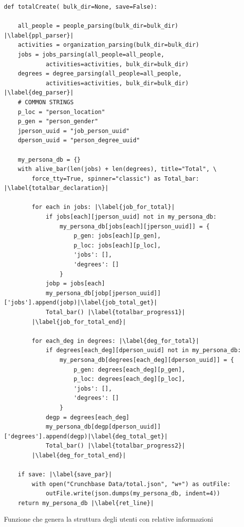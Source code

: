 \begin{listing}[htbp]
\begin{verbatim}
def totalCreate( bulk_dir=None, save=False):
    
    all_people = people_parsing(bulk_dir=bulk_dir)  |\label{ppl_parser}|
    activities = organization_parsing(bulk_dir=bulk_dir)
    jobs = jobs_parsing(all_people=all_people,
            activities=activities, bulk_dir=bulk_dir)
    degrees = degree_parsing(all_people=all_people, 
            activities=activities, bulk_dir=bulk_dir) |\label{deg_parser}|
    # COMMON STRINGS
    p_loc = "person_location"
    p_gen = "person_gender"
    jperson_uuid = "job_person_uuid"
    dperson_uuid = "person_degree_uuid"
    
    my_persona_db = {}
    with alive_bar(len(jobs) + len(degrees), title="Total", \ 
        force_tty=True, spinner="classic") as Total_bar: |\label{totalbar_declaration}|
        
        for each in jobs: |\label{job_for_total}|
            if jobs[each][jperson_uuid] not in my_persona_db:
                my_persona_db[jobs[each][jperson_uuid]] = {
                    p_gen: jobs[each][p_gen],
                    p_loc: jobs[each][p_loc],
                    'jobs': [],
                    'degrees': []
                }
            jobp = jobs[each]   
            my_persona_db[jobp[jperson_uuid]]['jobs'].append(jobp)|\label{job_total_get}|  
            Total_bar() |\label{totalbar_progress1}|
        |\label{job_for_total_end}|
    
        for each_deg in degrees: |\label{deg_for_total}|
            if degrees[each_deg][dperson_uuid] not in my_persona_db:
                my_persona_db[degrees[each_deg][dperson_uuid]] = {
                    p_gen: degrees[each_deg][p_gen],
                    p_loc: degrees[each_deg][p_loc],
                    'jobs': [],
                    'degrees': []
                }
            degp = degrees[each_deg]
            my_persona_db[degp[dperson_uuid]]['degrees'].append(degp)|\label{deg_total_get}|  
            Total_bar() |\label{totalbar_progress2}|
        |\label{deg_for_total_end}|

    if save: |\label{save_par}|
        with open("Crunchbase Data/total.json", "w+") as outFile:
            outFile.write(json.dumps(my_persona_db, indent=4))
    return my_persona_db |\label{ret_line}|
\end{verbatim}
\caption{Funzione che genera la struttura degli utenti con relative informazioni}
\label{lst:tot_create}
\end{listing}

